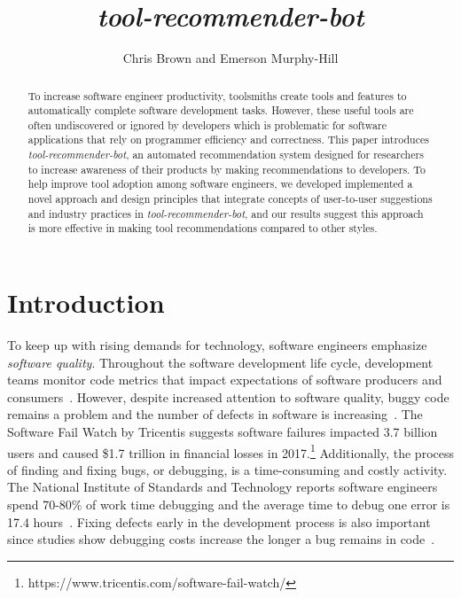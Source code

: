 \documentclass[sigconf,review,anonymous]{acmart}
\newcommand{\tool}{\textsl{tool-recommender-bot}}
\begin{document}

\title{\tool}

\author{Chris Brown and Emerson Murphy-Hill}

\begin{abstract}
To increase software engineer productivity, toolsmiths create tools and features to automatically complete software development tasks. However, these useful tools are often undiscovered or ignored by developers which is problematic for software applications that rely on programmer efficiency and correctness. This paper introduces \tool, an automated recommendation system designed for researchers to increase awareness of their products by making recommendations to developers. To help improve tool adoption among software engineers, we developed implemented a novel approach and design principles that integrate concepts of user-to-user suggestions and industry practices in \tool, and our results suggest this approach is more effective in making tool recommendations compared to other styles.
\end{abstract}

\maketitle

\section{Introduction}

To keep up with rising demands for technology, software engineers emphasize \textit{software quality}. Throughout the software development life cycle, development teams monitor code metrics that impact expectations of software producers and consumers~\cite{KitchenhamQualityTarget}. However, despite increased attention to software quality, buggy code remains a problem and the number of defects in software is increasing~\cite{HaveThingsChanged}. The Software Fail Watch by Tricentis suggests software failures impacted 3.7 billion users and caused \$1.7 trillion in financial losses in 2017.\footnote{https://www.tricentis.com/software-fail-watch/} Additionally, the process of finding and fixing bugs, or debugging, is a time-consuming and costly activity. The National Institute of Standards and Technology reports software engineers spend 70-80\% of work time debugging and the average time to debug one error is 17.4 hours~\cite{NIST}. Fixing defects early in the development process is also important since studies show debugging costs increase the longer a bug remains in code~\cite{SEEconomics, SoftwareAssuranceSDLC}.
\end{document}
